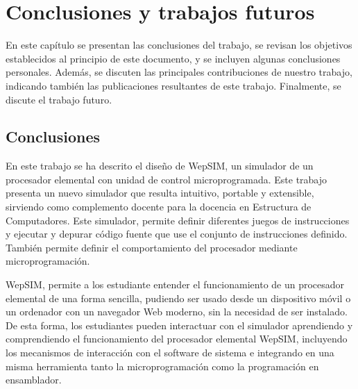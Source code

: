 \chead[]{}
\renewcommand{\headrulewidth}{0.5pt}

\lfoot[]{}
\cfoot[]{}
\rfoot[]{}
\renewcommand{\footrulewidth}{0pt}

\chapter{Conclusiones y trabajos futuros}
\label{ch:conclusions_and_future_work}

En este capítulo se presentan las conclusiones del trabajo, se revisan los objetivos establecidos al principio de este documento, y se incluyen algunas conclusiones personales. Además, se discuten las principales contribuciones de nuestro trabajo, indicando también las publicaciones resultantes de este trabajo. Finalmente, se discute el trabajo futuro.

\section{Conclusiones}

En este trabajo se ha descrito el diseño de WepSIM, un simulador de un procesador elemental con unidad de control microprogramada. Este trabajo presenta un nuevo simulador que resulta intuitivo, portable y extensible, sirviendo como complemento docente para la docencia en Estructura de Computadores. Este simulador, permite definir diferentes juegos de instrucciones y ejecutar y depurar código fuente que use el conjunto de instrucciones definido. También permite definir el comportamiento del procesador mediante microprogramación.

WepSIM, permite a los estudiante entender el funcionamiento de un procesador elemental de una forma sencilla, pudiendo ser usado desde un dispositivo móvil o un ordenador con un navegador Web moderno, sin la necesidad de ser instalado. De esta forma, los estudiantes pueden interactuar con el simulador aprendiendo y comprendiendo el funcionamiento del procesador elemental WepSIM, incluyendo los mecanismos de interacción con el software de sistema e integrando en una misma herramienta tanto la microprogramación como la programación en ensamblador.

